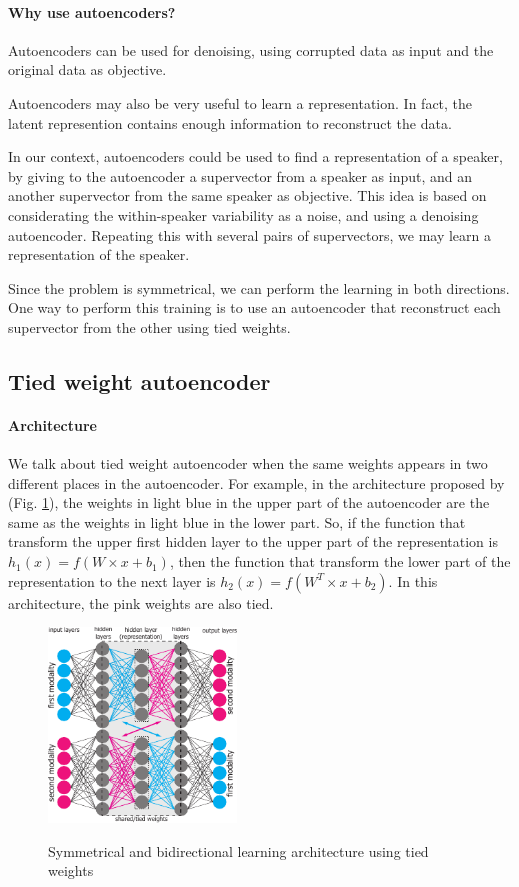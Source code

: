 \documentclass[conference]{IEEEtran}
\begin{document}
\paragraph{Why use autoencoders?}

Autoencoders can be used for denoising, using corrupted data as input and the original data as objective.

Autoencoders may also be very useful to learn a representation. In fact, the latent represention contains enough information to reconstruct the data.

In our context, autoencoders could be used to find a representation of a speaker, by giving to the autoencoder a supervector from a speaker as input, and an another supervector from the same speaker as objective. This idea is based on considerating the within-speaker variability as a noise, and using a denoising autoencoder. Repeating this with several pairs of supervectors, we may learn a representation of the speaker. 

Since the problem is symmetrical, we can perform the learning in both directions. One way to perform this training is to use an autoencoder that reconstruct each supervector from the other using tied weights.

\subsection{Tied weight autoencoder}

\paragraph{Architecture}

We talk about tied weight autoencoder when the same weights appears in two different places in the autoencoder. For example, in the architecture proposed by \cite{vukotic:hal-01314302} (Fig. \ref{archi_vedran}), the weights in light blue in the upper part of the autoencoder are the same as the weights in light blue in the lower part. So, if the function that transform the upper first hidden layer to the upper part of the representation is $h_1(x) = f(W \times x + b_1)$, then  the function that transform the lower part of the representation to the next layer is $h_2(x) = f(W^T \times x + b_2)$. In this architecture, the pink weights are also tied.

\begin{figure}[!h]
    \centering
    \caption{Symmetrical and bidirectional learning architecture using tied weights}
    \includegraphics[width=5cm]{archi-vedran.pdf}
    \label{archi_vedran}
\end{figure}
\end{document}
